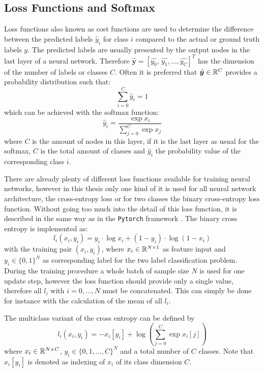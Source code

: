 
\subsection{Loss Functions and Softmax}
Loss functions also known as cost functions are used to determine the difference between the predicted labels $\hat{y}_i$ for class $i$ compared to the actual or ground truth labels $y$.
The predicted labels are usually presented by the output nodes in the last layer of a neural network.
Therefore $\hat{\bm{y}} = [\hat{y_0}, \, \hat{y_1}, \dots, \hat{y_C}]^T$ has the dimension of the number of labels or classes $C$.
Often it is preferred that $\hat{\bm{y}} \in \mathbb{R}^C$ provides a probability distribution such that:
\begin{equation}
  \sum_{i=0}^C \hat{y}_i = 1
\end{equation}
which can be achieved with the softmax function:
\begin{equation}\label{eq:nn_theory_softmax}
  \hat{y}_i = \frac{\exp{x_i}}{\sum_{j=0}^{C}\exp{x_j}}
\end{equation}
where $C$ is the amount of nodes in this layer, if it is the last layer as usual for the softmax, $C$ is the total amount of classes and $\hat{y}_i$ the probability value of the corresponding class $i$.

There are already plenty of different loss functions available for training neural networks, however in this thesis only one kind of it is used for all neural network architecture, the cross-entropy loss or for two classes the binary cross-entropy loss function.
Without going too much into the detail of this loss function, it is described in the same way as in the \texttt{Pytorch} framework \cite{Pytorch}.
The binary cross entropy is implemented as:
\begin{equation}
  l_i(x_i, y_i) = y_i \cdot \log x_i + (1 - y_i) \cdot \log (1 - x_i)
\end{equation}
with the training pair $(x_i, y_i)$, where $x_i \in \mathbb{R}^{N \times 1}$ as feature input and $y_i \in \{0, 1\}^N$ as corresponding label for the two label classification problem.
During the training procedure a whole batch of sample size $N$ is used for one update step, however the loss function should provide only a single value, therefore all $l_i$ with $i = 0, \dots, N$ must be concatenated.
This can simply be done for instance with the calculation of the mean of all $l_i$.

The multiclass variant of the cross entropy can be defined by
\begin{equation}
  l_i(x_i, y_i) = - x_i[y_i] + \log{\left( \sum_{j=0}^{C} \exp{x_i[j]} \right)}
\end{equation}
where $x_i \in \mathbb{R}^{N \times C}$, $y_i \in \{0, 1, \dots, C\}^N$ and a total number of $C$ classes.
Note that $x_i[y_i]$ is denoted as indexing of $x_i$ of its class dimension $C$. 


